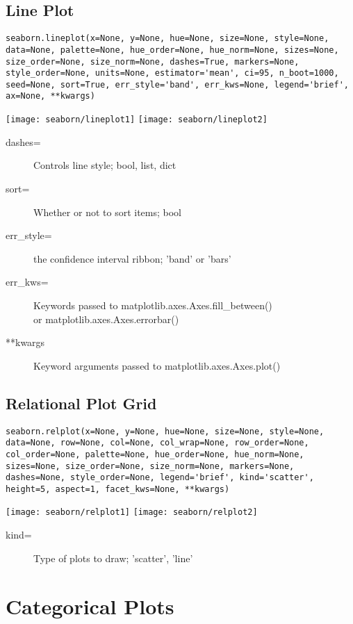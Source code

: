 \subsection{Line Plot}
\begin{verbatim}
seaborn.lineplot(x=None, y=None, hue=None, size=None, style=None, 
data=None, palette=None, hue_order=None, hue_norm=None, sizes=None,
size_order=None, size_norm=None, dashes=True, markers=None, 
style_order=None, units=None, estimator='mean', ci=95, n_boot=1000, 
seed=None, sort=True, err_style='band', err_kws=None, legend='brief', 
ax=None, **kwargs)
\end{verbatim}
\texttt{[image: seaborn/lineplot1]}
\texttt{[image: seaborn/lineplot2]}
\begin{description}
	\item[dashes=] Controls line style; bool, list, dict
	\item[sort=] Whether or not to sort items; bool
	\item[err\_style=] the confidence interval ribbon; 'band' or 'bars'
	\item[err\_kws=] Keywords passed to matplotlib.axes.Axes.fill\_between() \\ or matplotlib.axes.Axes.errorbar()
	\item[**kwargs] Keyword arguments passed to matplotlib.axes.Axes.plot()
\end{description}

\subsection{Relational Plot Grid}
\begin{verbatim}
seaborn.relplot(x=None, y=None, hue=None, size=None, style=None,
data=None, row=None, col=None, col_wrap=None, row_order=None,
col_order=None, palette=None, hue_order=None, hue_norm=None,
sizes=None, size_order=None, size_norm=None, markers=None,
dashes=None, style_order=None, legend='brief', kind='scatter',
height=5, aspect=1, facet_kws=None, **kwargs)
\end{verbatim}
\texttt{[image: seaborn/relplot1]}
\texttt{[image: seaborn/relplot2]}
\begin{description}
	\item[kind=] Type of plots to draw; 'scatter', 'line'
\end{description}

\section{Categorical Plots}

